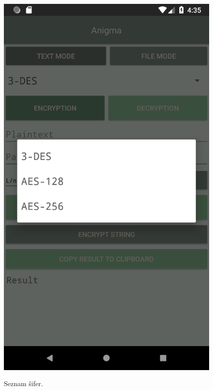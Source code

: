 \documentclass[12pt, a4paper]{article}
\begin{document}
\begin{figure}[h]
\caption{Seznam šifer.}
\centering
\includegraphics[height=0.4\textheight]{ciphers}
\label{fig:ciphers}
\end{figure}
\end{document}
